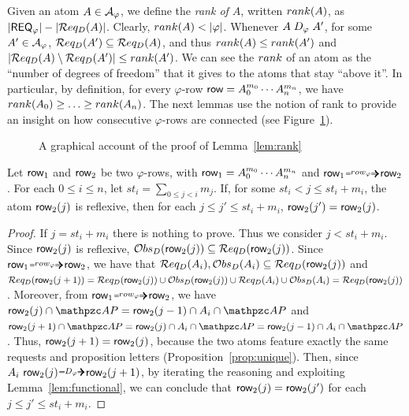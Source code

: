 Given an atom $A \in \mathcal{A}_{\varphi}$, we define the \emph{rank of $A$}, written $rank(A)$, as %
$|\mathsf{REQ}_\varphi| - |\mathcal{R} eq_D(A)|$.  Clearly, $rank(A)< |\varphi|$. Whenever $A \mathrel{D_\varphi} A'$, for some $A' \in \mathcal{A}_{\varphi}$, $\mathcal{R} eq_D(A')\subseteq \mathcal{R} eq_D(A)$, and thus  $rank(A)\leq rank(A')$ and $|\mathcal{R} eq_D(A)\setminus \mathcal{R} eq_D(A')|\leq rank(A')$.
We can see the $rank$ of an atom as the ``number of degrees of freedom'' 
that it gives to %
the atoms  that stay ``above it''.
In particular, by definition, for every $\varphi$-row $\text{{\sffamily row}}=A_0^{m_0} \cdots A_n^{m_n}$, we have $rank(A_0)\geq \ldots \geq  rank(A_n)$.
%
The next lemmas use the notion of rank to provide an insight on how consecutive $\varphi$-rows are connected
(see Figure~\ref{fig:rank}).

\begin{figure}[tb]
    \centering
    \resizebox{\linewidth}{!}{}
\caption{A graphical account of the proof of Lemma~\ref{lem:rank}}\label{fig:rank}
\end{figure}

\begin{lemma}\label{lem:rank0}
Let $\text{{\sffamily row}}_1$ and $\text{{\sffamily row}}_2$ be two $\varphi$-rows, with
$\text{{\sffamily row}}_1= A_0^{m_0}\cdots A_n^{m_n}$ and $\row_1\rownext \row_2$. 
For each $0\leq i\leq n$, let $st_i=\sum_{0\leq j <i} m_j$.
If, for some $st_i<j\leq st_i + m_i $, the atom $\text{{\sffamily row}}_2(j)$ is reflexive, then 
for each $j\leq j'\leq st_i + m_i$, $\text{{\sffamily row}}_2(j')=\text{{\sffamily row}}_2(j)$.
\end{lemma}
\begin{proof}
If $j=st_i+m_i$ there is nothing to prove. Thus we consider $j<st_i+m_i$.
Since $\text{{\sffamily row}}_2(j)$ is reflexive,   
$\mathcal{O} bs_D(\text{{\sffamily row}}_2(j))\subseteq \mathcal{R} eq_D(\text{{\sffamily row}}_2(j)) $. %
%
Since $\row_1 \rownext \row_2 $, we have that $\mathcal{R} eq_D(A_i),\mathcal{O} bs_D(A_i)\subseteq\mathcal{R} eq_D(\text{{\sffamily row}}_2(j))$ %
and $\mathcal{R} eq_D(\text{{\sffamily row}}_2(j+1))=\mathcal{R} eq_D(\text{{\sffamily row}}_2(j))\cup\mathcal{O} bs_D(\text{{\sffamily row}}_2(j))\cup\mathcal{R} eq_D(A_i)\cup\mathcal{O} bs_D(A_i)=\mathcal{R} eq_D(\text{{\sffamily row}}_2(j))$.
%
Moreover, from $\row_1 \rownext \row_2 $, we have $\row_2(j)\cap \AP = \row_2(j-1) \cap A_i\cap \AP$ and $\row_2(j+1)\cap \AP = \row_2(j) \cap A_i\cap \AP=\row_2(j-1) \cap A_i\cap \AP$. 
Thus, $\text{{\sffamily row}}_2(j+1) = \text{{\sffamily row}}_2(j)$, because the two atoms feature exactly the same requests and proposition letters (Proposition~\ref{prop:unique}).
Then,
since $A_i \ \row_2(j)\genDphi \row_2(j+1)$, 
by iterating the reasoning and exploiting Lemma~\ref{lem:functional}, we can conclude that
$\text{{\sffamily row}}_2(j)=\text{{\sffamily row}}_2(j')$ for each $j\leq j'\leq st_i + m_i$.
\end{proof}

